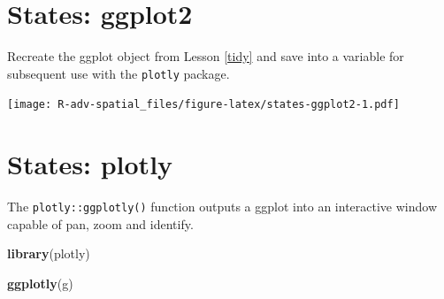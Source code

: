 \documentclass[]{book}
\newenvironment{Shaded}{\begin{snugshade}}{\end{snugshade}}
\newcommand{\KeywordTok}[1]{\textcolor[rgb]{0.13,0.29,0.53}{\textbf{{#1}}}}
\newcommand{\DataTypeTok}[1]{\textcolor[rgb]{0.13,0.29,0.53}{{#1}}}
\newcommand{\DecValTok}[1]{\textcolor[rgb]{0.00,0.00,0.81}{{#1}}}
\newcommand{\StringTok}[1]{\textcolor[rgb]{0.31,0.60,0.02}{{#1}}}
\newcommand{\CommentTok}[1]{\textcolor[rgb]{0.56,0.35,0.01}{\textit{{#1}}}}
\newcommand{\NormalTok}[1]{{#1}}
\theoremstyle{definition}
\theoremstyle{definition}
\theoremstyle{definition}
\theoremstyle{remark}
\begin{document}
\section{States: ggplot2}\label{states-ggplot2}

Recreate the ggplot object from Lesson \ref{tidy} and save into a
variable for subsequent use with the \texttt{plotly} package.

\begin{Shaded}
\end{Shaded}

\texttt{[image: R-adv-spatial\_files/figure-latex/states-ggplot2-1.pdf]}

\section{States: plotly}\label{states-plotly}

The \texttt{plotly::ggplotly()} function outputs a ggplot into an
interactive window capable of pan, zoom and identify.

\begin{Shaded}
\begin{Highlighting}[]
\KeywordTok{library}\NormalTok{(plotly)}

\KeywordTok{ggplotly}\NormalTok{(g)}
\end{Highlighting}
\end{Shaded}
\end{document}
